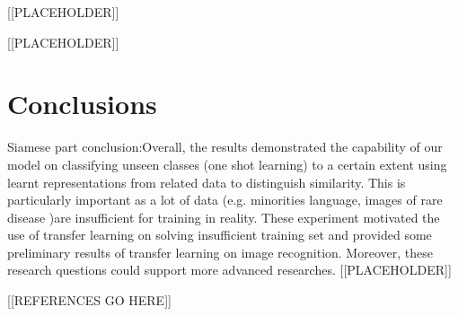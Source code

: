\documentclass{article}
\begin{document}
[[PLACEHOLDER]]

[[PLACEHOLDER]]

\section{Conclusions}
\label{sec:conclusions}
Siamese part conclusion:Overall, the results demonstrated the capability of our model on classifying unseen classes (one shot learning)
to a certain extent using learnt representations from related data to distinguish similarity.
This is particularly important as a lot of data (e.g. minorities language, images of rare disease )are insufficient for training in 
reality. These experiment motivated the use of transfer learning on solving insufficient training set and provided some preliminary 
results of transfer learning on image recognition. Moreover, these research questions could support more advanced researches.
[[PLACEHOLDER]]

[[REFERENCES GO HERE]]

%
%
\end{document}
